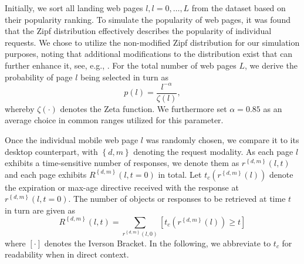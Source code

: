 \documentclass[letterpaper,conference]{IEEEtran}
\begin{document}
Initially, we sort all landing web pages $l, l=0,\ldots,L$ from the 
dataset based on their popularity ranking.
To simulate the popularity of web pages, it was found that the Zipf distribution effectively describes the popularity of individual requests. %
We chose to utilize the non-modified Zipf distribution for our simulation purposes, noting that additional modifications to the distribution exist that can further enhance it, see, e.g., \cite{KrTeSh06}.
For the total number of web pages $L$, we derive the probability of page $l$ being selected in turn as
\begin{equation}
p(l)=\frac{l^{-\alpha}}{\zeta(l)},
\end{equation}
whereby $\zeta(\cdot)$ denotes the Zeta function. 
We furthermore set $\alpha=0.85$ as an average choice in common ranges utilized for this parameter.


Once the individual mobile web page $l$ was randomly chosen, we compare it to its desktop counterpart, with $\left\{ d,m \right\}$ denoting the request modality.
As each page $l$ exhibits a time-sensitive number of responses, we denote them as $r^{\left\{ d,m \right\}}(l,t)$ and each page exhibits $R^{\left\{ d,m \right\}}(l,t=0)$ in total.
Let $t_c(r^{\left\{ d,m \right\}}(l))$ denote the expiration or max-age directive received with the response at $r^{\left\{ d,m \right\}}(l,t=0)$.
The number of objects or responses to be retrieved at time $t$ in turn are given as 
\begin{equation}
R^{\left\{ d,m \right\}}(l,t) = \sum_{r^{\left\{ d,m \right\}}(l,0)} \left[ t_c(r^{\left\{ d,m \right\}}(l)) \ge t \right]
\end{equation}
where $\left[ \cdot \right] $ denotes the Iverson Bracket.
In the following, we abbreviate to $t_c$ for readability when in direct context.
\end{document}
